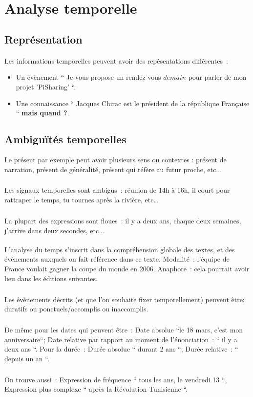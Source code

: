 \section*{Analyse temporelle}
\subsection*{Représentation}
\paragraph{}
Les informations temporelles peuvent avoir des repèsentations différentes~: 
\begin{itemize}
\item Un évènement `` Je vous propose un rendez-vous $demain$ pour parler de mon projet 'PiSharing' ``. \item Une connaissance `` Jacques Chirac est le président de la république Française `` \textbf{ mais quand ?}.
\end{itemize}
\subsection*{Ambiguïtés temporelles}
Le présent par exemple peut avoir plusieurs sens ou contextes : présent de narration, présent de généralité, présent qui réfère au futur proche, etc...
\subparagraph{}
Les signaux temporelles sont ambigus~: réunion de 14h à 16h, il court pour rattraper le temps, tu tournes après la rivière, etc…
\subparagraph{}
La plupart des expressions sont floues~: il y a deux ans, chaque deux semaines, j’arrive dans deux secondes, etc...
\paragraph{}
L’analyse du temps s’inscrit dans la compréhension globale des textes, et des évènements auxquels on fait référence dans ce texte. 
\newline
Modalité~: l’équipe de France voulait gagner la coupe du monde en 2006. 
\newline
Anaphore~: cela pourrait avoir lieu dans les éditions suivantes.
\subparagraph{}
Les évènements décrits (et que l’on souhaite fixer temporellement) peuvent être: duratifs ou ponctuels/accomplis ou inaccomplis. 
\subparagraph{}
De même pour les dates qui peuvent être~: Date absolue ``le 18 mars, c'est mon anniversaire``; Date relative par rapport au moment de l’énonciation~: `` il y a deux ans ``. Pour la durée~: Durée absolue `` durant 2 ans ``; Durée relative~: `` depuis un an ``.
\subparagraph{}
On trouve aussi~: Expression de fréquence `` tous les ans, le vendredi 13 ``, Expression plus complexe `` après la Révolution Tunisienne ``.
